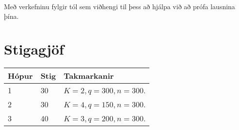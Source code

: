 Með verkefninu fylgir tól sem viðhengi til þess að hjálpa við að prófa lausnina þína.

\section*{Stigagjöf}
\begin{tabular}{|l|l|l|}
\hline
Hópur & Stig & Takmarkanir \\ \hline
1     & 30   & $K = 2, q = 300, n = 300$. \\ \hline
2     & 30   & $K = 4, q = 150, n = 300$. \\ \hline
3     & 40   & $K = 3, q = 200, n = 300$. \\ \hline
\end{tabular}
